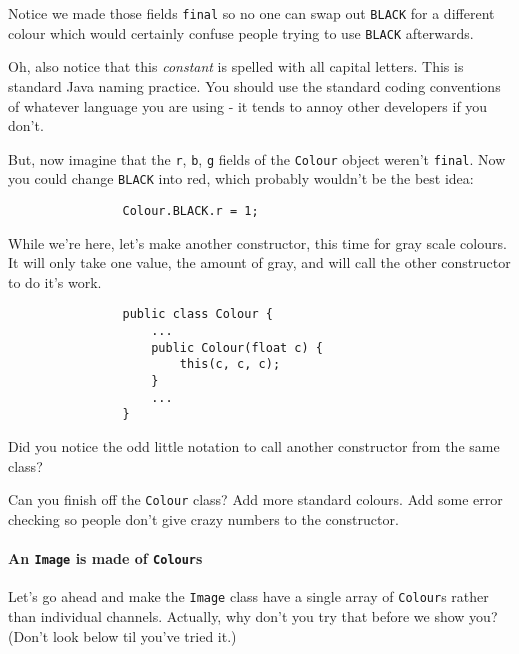 \documentclass{article}
\begin{document}
            Notice we made those fields \texttt{final} so no one can swap out \texttt{BLACK} for a different colour which would certainly
            confuse people trying to use \texttt{BLACK} afterwards.
        
            Oh, also notice that this \emph{constant} is spelled with all capital letters. This is standard Java naming practice. You
            should use the standard coding conventions of whatever language you are using - it tends to annoy other developers if you don't.
        
            But, now imagine that the \texttt{r}, \texttt{b}, \texttt{g} fields of the \texttt{Colour} object weren't \texttt{final}. Now
            you could change \texttt{BLACK} into red, which probably wouldn't be the best idea:
        
            \begin{verbatim}
                Colour.BLACK.r = 1;
            \end{verbatim}
        
            While we're here, let's make another constructor, this time for gray scale colours. It will only take one value, the amount of
            gray, and will call the other constructor to do it's work.

            \begin{verbatim}
                public class Colour {
                    ...
                    public Colour(float c) {
                        this(c, c, c);
                    }
                    ...
                }
            \end{verbatim}
            
            Did you notice the odd little notation to call another constructor from the same class?
        
            Can you finish off the \texttt{Colour} class? Add more standard colours. Add some error checking so people don't give crazy
            numbers to the constructor.
        
        \newpage
        \paragraph{An \texttt{Image} is made of \texttt{Colour}s}
            Let's go ahead and make the \texttt{Image} class have a single array of \texttt{Colour}s rather than individual channels.
            Actually, why don't you try that before we show you? (Don't look below til you've tried it.)
            
\end{document}
